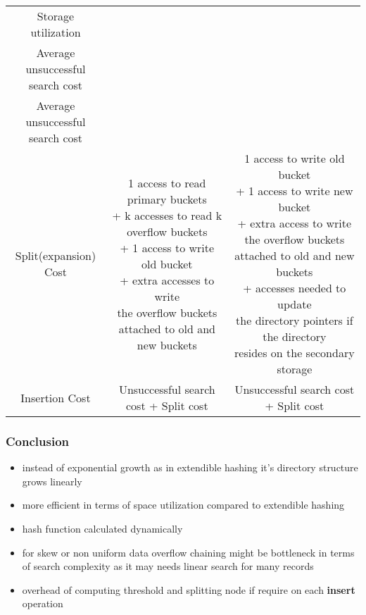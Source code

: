 \documentclass[paper=letter, fontsize=12pt]{article}
\newcommand*\tick{\item[\Checkmark]}
\newcommand*\fail{\item[\XSolidBrush]}
\begin{document}
\begin{table}[H]
	\bgroup
	\def\arraystretch{2}%
	\begin{tabular}{c | c | c}
		\thead{Factor} & \thead{Linear Hashing} & \thead{Extendible Hashing}\\
		\hline
		Storage utilization & \makecell{$\frac{N}{B \times b}$} & \makecell{$\frac{N}{B \times b}$} \\
		\makecell{Average unsuccessful \\search cost} & \makecell{$\frac{b_u}{u}$} & \makecell{$\frac{b_u}{u}$} \\
		\makecell{Average unsuccessful \\search cost} & \makecell{$\frac{b_s}{s}$} & \makecell{$\frac{b_s}{s}$} \\
		\makecell{Split(expansion) \\Cost} & \makecell{1 access to read primary buckets \\ + k accesses to read k overflow buckets \\ + 1 access to write old bucket \\ + extra accesses to write \\the overflow
		buckets \\attached to old and new buckets} & \makecell{1 access to write old bucket \\ + 1 access to write new bucket \\+ extra access to write the overflow buckets \\ attached to old and new buckets \\ + accesses needed to update \\the directory pointers if the directory \\resides on the secondary storage} \\
		Insertion Cost & Unsuccessful search cost + Split cost & Unsuccessful search cost + Split cost \\
	\end{tabular}
	\egroup
\end{table}

\subsubsection*{Conclusion}
\begin{itemize}
	\item instead of exponential growth as in extendible hashing it's directory structure grows linearly
	\tick more efficient in terms of space utilization compared to extendible hashing
	\tick hash function calculated dynamically
	\fail for skew or non uniform data overflow chaining might be bottleneck in terms of search complexity as it may needs linear search for many records
	\fail overhead of computing threshold and splitting node if require on each \textbf{insert} operation
\end{itemize}
\end{document}
